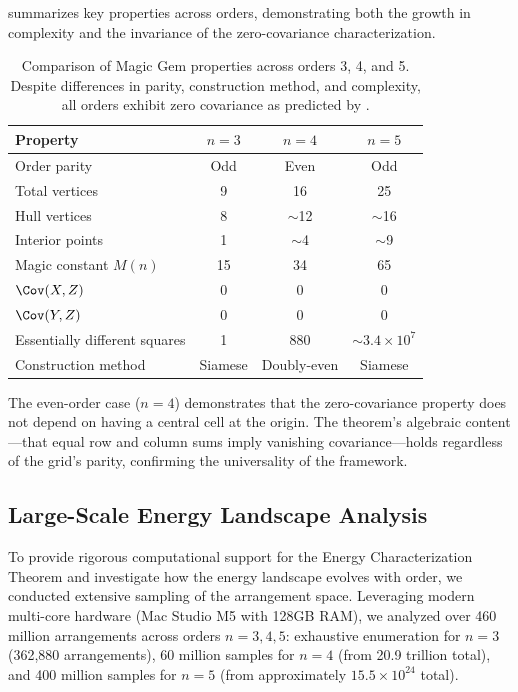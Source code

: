  summarizes key properties across orders,
demonstrating both the growth in complexity and the invariance of the zero-covariance characterization.

\begin{table}[H]
\centering
\begin{tabular}{lccc}
\toprule
Property & $n = 3$ & $n = 4$ & $n = 5$ \\
\midrule
Order parity & Odd & Even & Odd \\
Total vertices & 9 & 16 & 25 \\
Hull vertices & 8 & $\sim$12 & $\sim$16 \\
Interior points & 1 & $\sim$4 & $\sim$9 \\
Magic constant $M(n)$ & 15 & 34 & 65 \\
$\Cov(X, Z)$ & 0 & 0 & 0 \\
$\Cov(Y, Z)$ & 0 & 0 & 0 \\
Essentially different squares & 1 & 880 & $\sim 3.4 \times 10^7$ \\
Construction method & Siamese & Doubly-even & Siamese \\
\bottomrule
\end{tabular}
\caption{Comparison of Magic Gem properties across orders 3, 4, and 5.
Despite differences in parity, construction method, and complexity,
all orders exhibit zero covariance as predicted by .}
\label{tab:comparison_all}
\end{table}

The even-order case ($n = 4$) demonstrates that the zero-covariance property
does not depend on having a central cell at the origin.
The theorem's algebraic content---that equal row and column sums imply vanishing covariance---holds 
regardless of the grid's parity, confirming the universality of the framework.

\subsection{Large-Scale Energy Landscape Analysis}
\label{sec:large_scale_landscape}

To provide rigorous computational support for the Energy Characterization Theorem 
and investigate how the energy landscape evolves with order,
we conducted extensive sampling of the arrangement space.
Leveraging modern multi-core hardware (Mac Studio M5 with 128GB RAM),
we analyzed over 460 million arrangements across orders $n = 3, 4, 5$:
exhaustive enumeration for $n = 3$ (362,880 arrangements),
60 million samples for $n = 4$ (from 20.9 trillion total),
and 400 million samples for $n = 5$ (from approximately $15.5 \times 10^{24}$ total).

